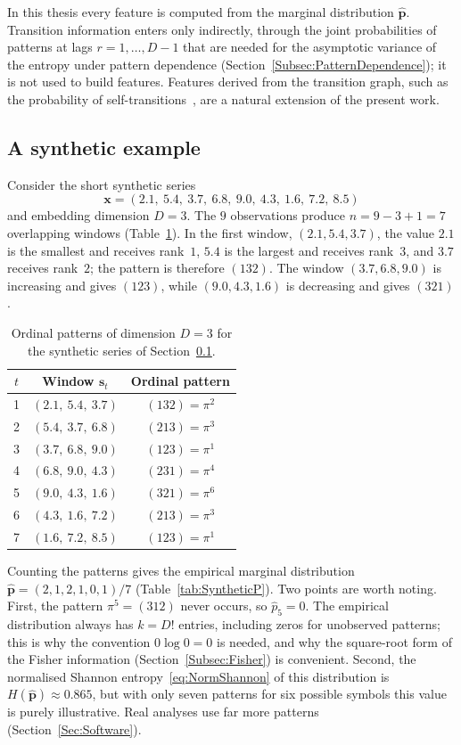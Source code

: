 In this thesis every feature is computed from the marginal distribution $\widehat{\mathbf{p}}$. Transition information enters only indirectly, through the joint probabilities of patterns at lags $r=1,\dots,D-1$ that are needed for the asymptotic variance of the entropy under pattern dependence (Section~\ref{Subsec:PatternDependence}); it is not used to build features. Features derived from the transition graph, such as the probability of self-transitions~\cite{Borges2019}, are a natural extension of the present work.

\subsection{A synthetic example}\label{Subsec:SyntheticExample}

Consider the short synthetic series
\[
\mathbf{x}=(2.1,\ 5.4,\ 3.7,\ 6.8,\ 9.0,\ 4.3,\ 1.6,\ 7.2,\ 8.5)
\]
and embedding dimension $D=3$. The $9$ observations produce $n=9-3+1=7$ overlapping windows (Table~\ref{tab:SyntheticOP}). In the first window, $(2.1,5.4,3.7)$, the value $2.1$ is the smallest and receives rank~$1$, $5.4$ is the largest and receives rank~$3$, and $3.7$ receives rank~$2$; the pattern is therefore $(132)$. The window $(3.7,6.8,9.0)$ is increasing and gives $(123)$, while $(9.0,4.3,1.6)$ is decreasing and gives $(321)$.

\begin{table}[H]
	\centering
	\begin{tabular}{ccc}
		\toprule
		$t$ & Window $\mathbf{s}_t$ & Ordinal pattern \\
		\midrule
		1 & $(2.1,\ 5.4,\ 3.7)$ & $(132)=\pi^2$ \\
		2 & $(5.4,\ 3.7,\ 6.8)$ & $(213)=\pi^3$ \\
		3 & $(3.7,\ 6.8,\ 9.0)$ & $(123)=\pi^1$ \\
		4 & $(6.8,\ 9.0,\ 4.3)$ & $(231)=\pi^4$ \\
		5 & $(9.0,\ 4.3,\ 1.6)$ & $(321)=\pi^6$ \\
		6 & $(4.3,\ 1.6,\ 7.2)$ & $(213)=\pi^3$ \\
		7 & $(1.6,\ 7.2,\ 8.5)$ & $(123)=\pi^1$ \\
		\bottomrule
	\end{tabular}
	\caption{Ordinal patterns of dimension $D=3$ for the synthetic series of Section~\ref{Subsec:SyntheticExample}.}
	\label{tab:SyntheticOP}
\end{table}

Counting the patterns gives the empirical marginal distribution $\widehat{\mathbf{p}}=(2,1,2,1,0,1)/7$ (Table~\ref{tab:SyntheticP}). Two points are worth noting. First, the pattern $\pi^5=(312)$ never occurs, so $\widehat{p}_5=0$. The empirical distribution always has $k=D!$ entries, including zeros for unobserved patterns; this is why the convention $0\log0=0$ is needed, and why the square-root form of the Fisher information (Section~\ref{Subsec:Fisher}) is convenient. Second, the normalised Shannon entropy~\eqref{eq:NormShannon} of this distribution is $H(\widehat{\mathbf{p}})\approx0.865$, but with only seven patterns for six possible symbols this value is purely illustrative. Real analyses use far more patterns (Section~\ref{Sec:Software}).

